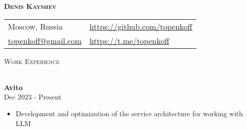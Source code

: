 \documentclass[a4paper]{article}
\newcommand{\lineunder} {
    \vspace*{-8pt} \\
    \hspace*{-18pt} \hrulefill \\
}
\newcommand{\header} [1] {
    {\hspace*{-18pt}\vspace*{6pt} \textsc{#1}}
    \vspace*{-6pt} \lineunder
}
\begin{document}
\vspace*{-40pt}

\vspace*{-10pt}
\begin{center}
    \textbf{{\huge \scshape {Denis Kayshev}}}\\
    \vspace*{10pt}
    \begin{tabular}{l l}
        Moscow, Russia & \url{https://github.com/topenkoff} \\
        \href{mailto:topenkoff@gmail.com}{topenkoff@gmail.com} & \url{https://t.me/topenkoff} \\
    \end{tabular}
    \vspace*{15pt}
\end{center}

\header{Work Experience}
\vspace{1mm}


\textbf{Avito} \\
 \hfill Dec 2023 - Present\\
\begin{itemize}[leftmargin=16pt,itemsep=0pt,topsep=-8pt,label={-}]
    \item Development and optimization of the service architecture for working with LLM
\end{itemize}
\vspace{\baselineskip}
\end{document}
